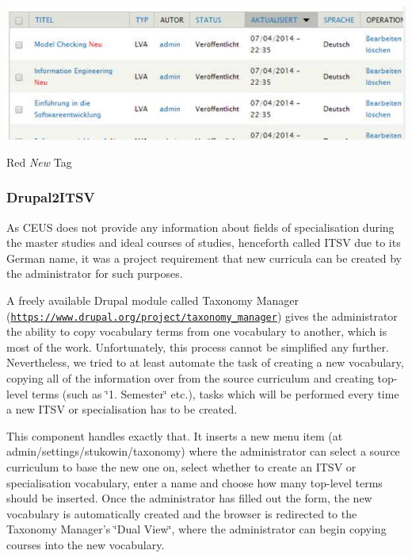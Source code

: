 \begin{DoxyImage}
\includegraphics[width=\textwidth]{NewTag}
\caption{Red {\itshape New} Tag}
\end{DoxyImage}
\hypertarget{index_Drupal2ITSV}{}\subsubsection{Drupal2\+I\+T\+S\+V}\label{index_Drupal2ITSV}
As C\+E\+U\+S does not provide any information about fields of specialisation during the master studies and ideal courses of studies, henceforth called I\+T\+S\+V due to its German name, it was a project requirement that new curricula can be created by the administrator for such purposes.

A freely available Drupal module called Taxonomy Manager (\href{https://www.drupal.org/project/taxonomy_manager}{\tt https\+://www.\+drupal.\+org/project/taxonomy\+\_\+manager}) gives the administrator the ability to copy vocabulary terms from one vocabulary to another, which is most of the work. Unfortunately, this process cannot be simplified any further. Nevertheless, we tried to at least automate the task of creating a new vocabulary, copying all of the information over from the source curriculum and creating top-\/level terms (such as \char`\"{}1. Semester\char`\"{} etc.), tasks which will be performed every time a new I\+T\+S\+V or specialisation has to be created.

This component handles exactly that. It inserts a new menu item (at admin/settings/stukowin/taxonomy) where the administrator can select a source curriculum to base the new one on, select whether to create an I\+T\+S\+V or specialisation vocabulary, enter a name and choose how many top-\/level terms should be inserted. Once the administrator has filled out the form, the new vocabulary is automatically created and the browser is redirected to the Taxonomy Manager's \char`\"{}\+Dual View\char`\"{}, where the administrator can begin copying courses into the new vocabulary.


